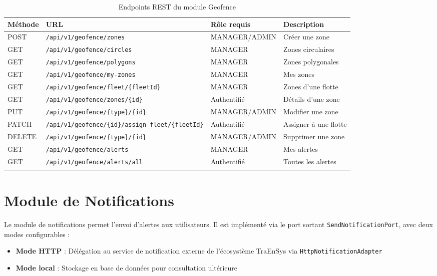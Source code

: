 \documentclass[12pt,a4paper]{report}
\begin{document}
\begin{longtable}{p{1.5cm}p{6cm}p{2.5cm}p{2.5cm}}
\toprule
\textbf{Méthode} & \textbf{URL} & \textbf{Rôle requis} & \textbf{Description} \\
\midrule
\endhead
POST & \texttt{/api/v1/geofence/zones} & MANAGER/ADMIN & Créer une zone \\
GET & \texttt{/api/v1/geofence/circles} & MANAGER & Zones circulaires \\
GET & \texttt{/api/v1/geofence/polygons} & MANAGER & Zones polygonales \\
GET & \texttt{/api/v1/geofence/my-zones} & MANAGER & Mes zones \\
GET & \texttt{/api/v1/geofence/fleet/\{fleetId\}} & MANAGER & Zones d'une flotte \\
GET & \texttt{/api/v1/geofence/zones/\{id\}} & Authentifié & Détails d'une zone \\
PUT & \texttt{/api/v1/geofence/\{type\}/\{id\}} & MANAGER/ADMIN & Modifier une zone \\
PATCH & \texttt{/api/v1/geofence/\{id\}/assign-fleet/\{fleetId\}} & Authentifié & Assigner à une flotte \\
DELETE & \texttt{/api/v1/geofence/\{type\}/\{id\}} & MANAGER/ADMIN & Supprimer une zone \\
GET & \texttt{/api/v1/geofence/alerts} & MANAGER & Mes alertes \\
GET & \texttt{/api/v1/geofence/alerts/all} & Authentifié & Toutes les alertes \\
\bottomrule
\caption{Endpoints REST du module Geofence}
\end{longtable}

\section{Module de Notifications}

Le module de notifications permet l'envoi d'alertes aux utilisateurs. Il est implémenté via le port sortant \texttt{SendNotificationPort}, avec deux modes configurables :

\begin{itemize}[leftmargin=2cm]
  \item \textbf{Mode HTTP} : Délégation au service de notification externe de l'écosystème TraEnSys via \texttt{HttpNotificationAdapter}
  \item \textbf{Mode local} : Stockage en base de données pour consultation ultérieure
\end{itemize}
\end{document}
